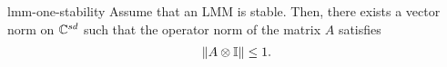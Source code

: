 \begin{Lemma}{lmm-one-stability}
  Assume that an LMM is stable. Then, there exists a vector norm on
  $\mathbb C^{s d}$ such that the operator norm of the matrix $A$
  satisfies
  \begin{gather}
    \label{eq:lmm-one-stability:1}
    \lVert A\otimes \mathbb I\rVert \le 1.
  \end{gather}
\end{Lemma}

